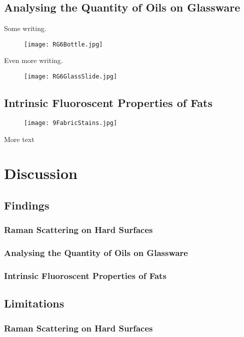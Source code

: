 \documentclass[a4paper ,12pt]{article}
\begin{document}
\subsection{Analysing the Quantity of Oils on Glassware}
Some writing.\\
\begin{figure}[h]
\centering
\texttt{[image: RG6Bottle.jpg]}
\end{figure}
Even more writing.\\
\begin{figure}[h]
\centering
\texttt{[image: RG6GlassSlide.jpg]}
\end{figure}
\subsection{Intrinsic Fluoroscent Properties of Fats}
\begin{figure}[h]
\centering
\texttt{[image: 9FabricStains.jpg]}
\end{figure}
More text

\section{Discussion}
\subsection{Findings}
\subsubsection{Raman Scattering on Hard Surfaces}
\subsubsection{Analysing the Quantity of Oils on Glassware}
\subsubsection{Intrinsic Fluoroscent Properties of Fats}

\subsection{Limitations}
\subsubsection{Raman Scattering on Hard Surfaces}
\end{document}
